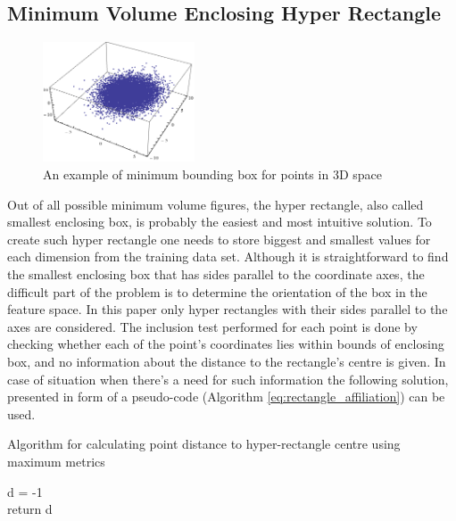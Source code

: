 \subsection{Minimum Volume Enclosing Hyper Rectangle}

\begin{figure}[htp]
	\centering
	\includegraphics[width=0.40\textwidth]{Figures/minimum_bounding_box.png}
	\caption{An example of minimum bounding box for points in 3D space}
	\label{fig:minimum_bounding_box_visualization}\vspace{-3pt}
\end{figure}

Out of all possible minimum volume figures, the hyper rectangle, also called smallest enclosing box, is probably the easiest and most intuitive solution. To create such hyper rectangle one needs to store biggest and smallest values for each dimension from the training data set. Although it is straightforward to find the smallest enclosing box that has sides parallel to the coordinate axes, the difficult part of the problem is to determine the orientation of the box in the feature space. In this paper only hyper rectangles with their sides parallel to the axes are considered. The inclusion test performed for each point is done by checking whether each of the point's coordinates lies within bounds of enclosing box, and no information about the distance to the rectangle's centre is given. In case of situation when there's a need for such information the following solution, presented in form of a pseudo-code (Algorithm \ref{eq:rectangle_affiliation}) can be used.

\begin{algorithm}
	\label{eq:rectangle_affiliation}
	\caption{Algorithm for calculating point distance to hyper-rectangle centre using maximum metrics}
	d = -1 \\
	return d \\
	\vspace{12pt}
\end{algorithm}